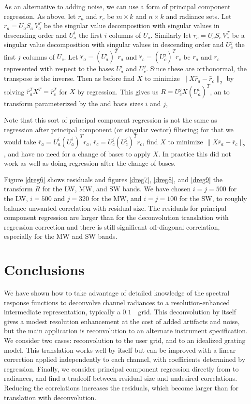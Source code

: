\documentclass[10pt,twocolumn]{article}
\begin{document}
As an alternative to adding noise, we can use a form of principal
component regression.  As above, let $r_a$ and $r_c$ be $m \times k$
and $n \times k$ {\airs} and {\cris} radiance sets.  Let $r_a = U_a
S_a\,V_a^T$ be the singular value decomposition with singular values
in descending order and $U_a^i$ the first $i$ columns of $U_a$.
Similarly let $r_c = U_c S_c\,V_c^T$ be a singular value
decomposition with singular values in descending order and $U_c^j$
the first $j$ columns of $U_c$.  Let $\hat r_a = (U_a^i)^T r_a$ and
$\hat r_c = (U_c^j)^T r_c$ be $r_a$ and $r_c$ represented with
respect to the bases $U_a^i$ and $U_c^j$.  Since these are
orthonormal, the transpose is the inverse.  Then as before find $X$
to minimize $\|X \hat r_a - \hat r_c\|_2$ by solving $\hat r_a^T X^T
= \hat r_c^T$ for $X$ by regression.  This gives us $R = U_c^j X
(U_a^i)^T$, an {\airs} to {\cris} transform parameterized by the
{\airs} and {\cris} basis sizes $i$ and $j$,

Note that this sort of principal component regression is not the
same as regression after principal component (or singular vector)
filtering; for that we would take $\bar r_a = U_a^i (U_a^i)^T r_a$,
$\bar r_c = U_c^j (U_c^j)^T r_c$, find $X$ to minimize $\|X \bar r_a
- \bar r_c\|_2$, and have no need for a change of bases to apply
$X$.  In practice this did not work as well as doing regression
after the change of bases.

Figure \ref{dreg6} shows residuals and figures \ref{dreg7},
\ref{dreg8}, and \ref{dreg9} the transform $R$ for the {\cris} LW,
MW, and SW bands.  We have chosen $i = j = 500$ for the LW, $i =
500$ and $j = 320$ for the MW, and $i = j = 100$ for the SW, to
roughly balance unwanted correlation with residual size.  The
residuals for principal component regression are larger than for the
deconvolution translation with regression correction and there is
still significant off-diagonal correlation, especially for the MW
and SW bands.

\section{Conclusions}
\label{appcon}

We have shown how to take advantage of detailed knowledge of the
{\airs} spectral response functions to deconvolve channel radiances
to a resolution-enhanced intermediate representation, typically a
$0.1$~\wn\ grid.  This deconvolution by itself gives a modest
resolution enhancement at the cost of added artifacts and noise, but
the main application is reconvolution to an alternate instrument
specification.  We consider two cases: reconvolution to the {\cris}
user grid, and to an idealized grating model.  This translation
works well by itself but can be improved with a linear correction
applied independently to each channel, with coefficients determined
by regression.  Finally, we consider principal component regression
directly from {\airs} to {\cris} radiances, and find a tradeoff
between residual size and undesired correlations.  Reducing the
correlations increases the residuals, which become larger than for
translation with deconvolution.
\end{document}
